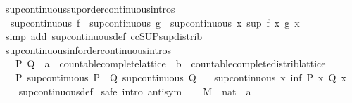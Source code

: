 \begin{isabellebody}
\ sup{\isacharunderscore}continuous{\isacharunderscore}sup{\isacharbrackleft}order{\isacharunderscore}continuous{\isacharunderscore}intros{\isacharbrackright}{\isacharcolon}\isanewline
\ \ {\isachardoublequoteopen}sup{\isacharunderscore}continuous\ f\ {\isasymLongrightarrow}\ sup{\isacharunderscore}continuous\ g\ {\isasymLongrightarrow}\ sup{\isacharunderscore}continuous\ {\isacharparenleft}{\isasymlambda}x{\isachardot}\ sup\ {\isacharparenleft}f\ x{\isacharparenright}\ {\isacharparenleft}g\ x{\isacharparenright}{\isacharparenright}{\isachardoublequoteclose}\isanewline
%
\isadelimproof
\ \ %
\endisadelimproof
%
\isatagproof
{}\isamarkupfalse%
\ {\isacharparenleft}simp\ add{\isacharcolon}\ sup{\isacharunderscore}continuous{\isacharunderscore}def\ ccSUP{\isacharunderscore}sup{\isacharunderscore}distrib{\isacharparenright}%
\endisatagproof
{\isafoldproof}%
%
\isadelimproof
\isanewline
%
\endisadelimproof
\isanewline
{}\isamarkupfalse%
\ sup{\isacharunderscore}continuous{\isacharunderscore}inf{\isacharbrackleft}order{\isacharunderscore}continuous{\isacharunderscore}intros{\isacharbrackright}{\isacharcolon}\isanewline
\ \ \ P\ Q\ {\isacharcolon}{\isacharcolon}\ {\isachardoublequoteopen}{\isacharprime}a\ {\isacharcolon}{\isacharcolon}\ countable{\isacharunderscore}complete{\isacharunderscore}lattice\ {\isasymRightarrow}\ {\isacharprime}b\ {\isacharcolon}{\isacharcolon}\ countable{\isacharunderscore}complete{\isacharunderscore}distrib{\isacharunderscore}lattice{\isachardoublequoteclose}\isanewline
\ \ \ P{\isacharcolon}\ {\isachardoublequoteopen}sup{\isacharunderscore}continuous\ P{\isachardoublequoteclose}\ \ Q{\isacharcolon}\ {\isachardoublequoteopen}sup{\isacharunderscore}continuous\ Q{\isachardoublequoteclose}\isanewline
\ \ \ {\isachardoublequoteopen}sup{\isacharunderscore}continuous\ {\isacharparenleft}{\isasymlambda}x{\isachardot}\ inf\ {\isacharparenleft}P\ x{\isacharparenright}\ {\isacharparenleft}Q\ x{\isacharparenright}{\isacharparenright}{\isachardoublequoteclose}\isanewline
%
\isadelimproof
\ \ %
\endisadelimproof
%
\isatagproof
{}\isamarkupfalse%
\ sup{\isacharunderscore}continuous{\isacharunderscore}def\isanewline
{}\isamarkupfalse%
\ {\isacharparenleft}safe\ intro{\isacharbang}{\isacharcolon}\ antisym{\isacharparenright}\isanewline
\ \ \isamarkupfalse%
\ M\ {\isacharcolon}{\isacharcolon}\ {\isachardoublequoteopen}nat\ {\isasymRightarrow}\ {\isacharprime}a{\isachardoublequoteclose}\ \isamarkupfalse%

\end{isabellebody}
